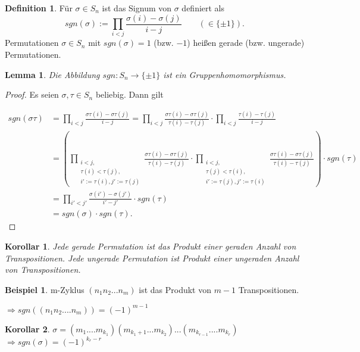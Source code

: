 \documentclass[12pt]{scrartcl}%
\newtheorem{lemma}{Lemma}
\newtheorem{kor}{Korollar}
\theoremstyle{definition}
\newtheorem*{defn}{Definition}
\newtheorem{ex}{Beispiel}
\theoremstyle{remark}
\begin{document}
\begin{defn}
Für $\sigma\in S_n$ ist das Signum von $\sigma$ definiert als
    \[sgn(\sigma) := \prod_{i<j}\frac{\sigma(i)-\sigma(j)}{i-j}\qquad(\in\{\pm 1\}).\]
Permutationen $\sigma\in S_n$ mit $sgn(\sigma) = 1$ (bzw. $-1$) heißen gerade (bzw. ungerade) Permutationen.
\end{defn}

\begin{lemma}
Die Abbildung $sgn:S_n\to\{\pm 1\}$ ist ein Gruppenhomomorphismus.
\end{lemma}

\begin{proof}
Es seien $\sigma,\tau\in S_n$ beliebig. Dann gilt 

\begin{equation*}
    \begin{split}
        sgn(\sigma\tau) &= \prod_{i<j}\frac{\sigma\tau(i)-\sigma\tau(j)}{i-j} = \prod_{i<j}\frac{\sigma\tau(i)-\sigma\tau(j)}{\tau(i)-\tau(j)}\cdot\prod_{i<j}\frac{\tau(i)-\tau(j)}{i-j} \\
        &= \left(\prod_{\substack{i<j,\\\tau(i)<\tau(j),\\ i':=\tau(i),j':=\tau(j)}}\frac{\sigma\tau(i)-\sigma\tau(j)}{\tau(i)-\tau(j)}\cdot \prod_{\substack{i<j,\\\tau(j)<\tau(i),\\ i':=\tau(j),j':=\tau(i)}}\frac{\sigma\tau(i)-\sigma\tau(j)}{\tau(i)-\tau(j)}\right)\cdot sgn(\tau) \\
        &=\prod_{i'<j'}\frac{\sigma(i')-\sigma(j')}{i'-j'}\cdot sgn(\tau) \\
        &= sgn(\sigma)\cdot sgn(\tau).
    \end{split}
\end{equation*}
\end{proof}

	\begin{kor}
	Jede gerade Permutation ist das Produkt einer geraden Anzahl von Transpositionen. Jede ungerade Permutation ist Produkt einer ungeraden Anzahl von Transpositionen.
	\end{kor}

	\begin{ex}
	m-Zyklus $(n_1n_2...n_m)$ ist das Produkt von $m-1$ Transpositionen.  
	
	$\Rightarrow sgn((n_1n_2....n_m))=(-1)^{m-1}$
	\end{ex}

	\begin{kor}
	$\sigma = (m_1....m_{k_1})(m_{k_1+1}...m_{k_2})...(m_{k_{r-1}}....m_{k_r})$	$\Rightarrow sgn(\sigma)=(-1)^{k_r-r}$
	\end{kor}
\end{document}
